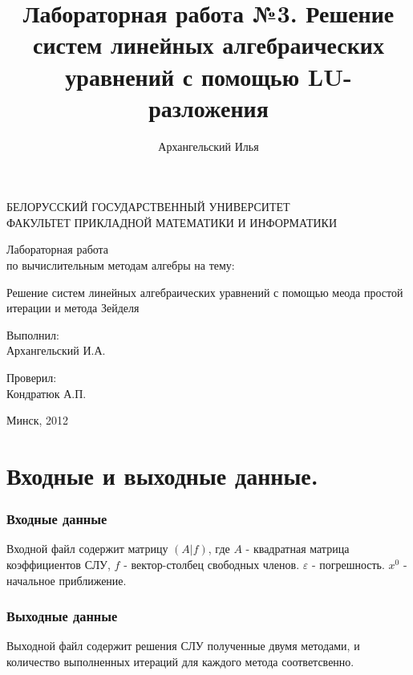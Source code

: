 \documentclass[a4paper,11pt]{extarticle}
\title{Лабораторная работа №3. Решение систем линейных алгебраических уравнений с помощью LU-разложения}
\author{Архангельский Илья}
\begin{document}
\begin{titlepage}
	\begin{center}
		БЕЛОРУССКИЙ ГОСУДАРСТВЕННЫЙ УНИВЕРСИТЕТ \\
		ФАКУЛЬТЕТ ПРИКЛАДНОЙ МАТЕМАТИКИ И ИНФОРМАТИКИ
	\end{center}
	\vspace{10em}
	\begin{center}
		\LARGE {Лабораторная работа \\
		по вычислительным методам алгебры на тему:}
		\linebreak	 
		
    Решение систем линейных алгебраических уравнений с помощью меода простой итерации и метода Зейделя
	\end{center}
	\vspace{3em}
	\begin{flushright}
	  
	
 	Выполнил: \\	Архангельский И.А. \\ 
 	
 	  \vspace{1em}
 	
 	  Проверил: \\ Кондратюк А.П. \\
 	
	\end{flushright}
	
	\vfill
	\begin{center}
		Минск, 2012
	\end{center}
\end{titlepage} 

\newpage
\part*{Входные и выходные данные.} 
\section*{Входные данные}
Входной файл содержит матрицу $(A|f)$, где  
  $A$ - квадратная матрица коэффициентов СЛУ, 
  $f$ - вектор-столбец свободных членов.
  $\varepsilon$ - погрешность.
  $x^0$ - начальное приближение.
\section*{Выходные данные}
Выходной файл содержит решения СЛУ полученные двумя методами, и количество выполненных итераций для каждого метода соответсвенно. 
\newpage
\end{document}
